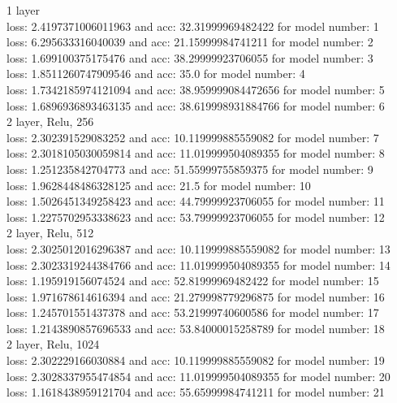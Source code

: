\documentclass{article}
\begin{document}
1 layer\\
loss: 2.4197371006011963 and acc: 32.31999969482422	for model number: 1 \\ 
loss: 6.295633316040039 and acc: 21.15999984741211 for model number: 2 \\
loss: 1.699100375175476 and acc: 38.29999923706055 for model number: 3 \\
loss: 1.8511260747909546 and acc: 35.0 for model number: 4 \\
loss: 1.7342185974121094 and acc: 38.959999084472656 for model number: 5 \\
loss: 1.6896936893463135 and acc: 38.619998931884766 for model number: 6 \\
2 layer, Relu, 256 \\
loss: 2.302391529083252 and acc: 10.119999885559082 for model number: 7 \\
loss: 2.3018105030059814 and acc: 11.019999504089355 for model number: 8 \\
loss: 1.251235842704773 and acc: 51.55999755859375 for model number: 9 \\
loss: 1.9628448486328125 and acc: 21.5 for model number: 10 \\
loss: 1.5026451349258423 and acc: 44.79999923706055 for model number: 11 \\
loss: 1.2275702953338623 and acc: 53.79999923706055 for model number: 12 \\
2 layer, Relu, 512 \\
loss: 2.3025012016296387 and acc: 10.119999885559082 for model number: 13 \\
loss: 2.3023319244384766 and acc: 11.019999504089355 for model number: 14 \\
loss: 1.195919156074524 and acc: 52.81999969482422 for model number: 15 \\
loss: 1.971678614616394 and acc: 21.279998779296875 for model number: 16 \\
loss: 1.245701551437378 and acc: 53.21999740600586 for model number: 17 \\
loss: 1.2143890857696533 and acc: 53.84000015258789 for model number: 18 \\
2 layer, Relu, 1024 \\
loss: 2.302229166030884 and acc: 10.119999885559082 for model number: 19 \\
loss: 2.3028337955474854 and acc: 11.019999504089355 for model number: 20 \\
loss: 1.1618438959121704 and acc: 55.65999984741211 for model number: 21 \\
\end{document}
